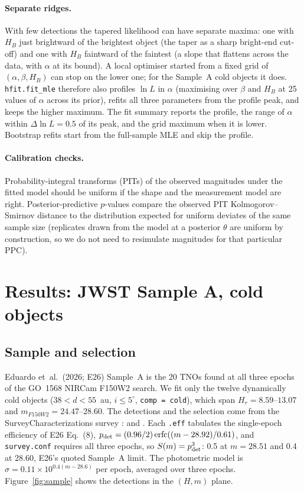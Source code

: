 \documentclass[11pt,a4paper]{article}
\begin{document}
\paragraph{Separate ridges.}
With few detections the tapered likelihood can have separate maxima: one with
$H_B$ just brightward of the brightest object (the taper as a sharp bright-end
cut-off) and one with $H_B$ faintward of the faintest (a slope that flattens
across the data, with $\alpha$ at its bound).  A local optimiser started
from a fixed grid of $(\alpha,\beta,H_B)$ can stop on the lower one; for the
Sample~A cold objects it does.  \texttt{hfit.fit\_mle} therefore also
profiles $\ln L$ in $\alpha$ (maximising over $\beta$ and $H_B$ at 25 values
of $\alpha$ across its prior), refits all three parameters from the profile
peak, and keeps the higher maximum.  The fit summary reports the profile, the
range of $\alpha$ within $\Delta\ln L=0.5$ of its peak, and the grid maximum
when it is lower.  Bootstrap refits start from the full-sample MLE and skip
the profile.

\paragraph{Calibration checks.}
Probability-integral transforms (PITs) of the observed magnitudes under the
fitted model should be uniform if the shape and the measurement model are
right.  Posterior-predictive $p$-values compare the observed PIT
Kolmogorov--Smirnov distance to the distribution expected for uniform
deviates of the same sample size (replicates drawn from the model at a
posterior $\theta$ are uniform by construction, so we do not need to resimulate
magnitudes for that particular PPC).

\section{Results: JWST Sample A, cold objects}
\label{sec:results}

\subsection{Sample and selection}

Eduardo et~al.\ (2026; E26) Sample~A is the 20 TNOs found at all three
epochs of the GO~1568 NIRCam F150W2 search.  We fit only the twelve
dynamically cold objects ($38<d<55$~au, $i\le5^\circ$, \texttt{comp = cold}),
which span $H_r = 8.59$--$13.07$ and $m_{F150W2} = 24.47$--$28.60$.  The
detections and the selection come from the SurveyCharacterizations survey
:  and
.  Each \texttt{.eff} tabulates
the single-epoch efficiency of E26 Eq.~(8),
$p_{\rm det} = (0.96/2)\,\mathrm{erfc}((m-28.92)/0.61)$, and
\texttt{survey.conf} requires all three epochs, so
$S(m)=p_{\rm det}^3$: 0.5 at $m=28.51$ and 0.4 at $28.60$, E26's quoted
Sample~A limit.  The photometric model is
$\sigma = 0.11\times10^{0.4(m-28.6)}$ per epoch, averaged over three epochs.
Figure~\ref{fig:sample} shows the detections in the $(H,m)$ plane.
\end{document}
